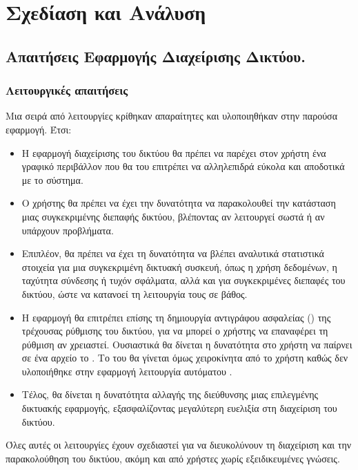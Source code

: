 \chapter{Σχεδίαση και Ανάλυση}

\section{Απαιτήσεις Εφαρμογής Διαχείρισης Δικτύου.}




\subsection{Λειτουργικές απαιτήσεις}

Μια σειρά από λειτουργίες κρίθηκαν απαραίτητες και υλοποιηθήκαν στην παρούσα εφαρμογή. Έτσι:

\begin{itemize}
    \item Η εφαρμογή διαχείρισης του δικτύου θα πρέπει να  παρέχει στον χρήστη ένα γραφικό περιβάλλον που θα του επιτρέπει να αλληλεπιδρά εύκολα και αποδοτικά με το σύστημα. 
    \item Ο χρήστης θα πρέπει να έχει την δυνατότητα να παρακολουθεί την κατάσταση μιας συγκεκριμένης διεπαφής δικτύου, βλέποντας αν λειτουργεί σωστά ή αν υπάρχουν προβλήματα. 
    \item Επιπλέον, θα πρέπει να έχει τη δυνατότητα να βλέπει αναλυτικά στατιστικά στοιχεία για μια συγκεκριμένη δικτυακή συσκευή, όπως η χρήση δεδομένων, η ταχύτητα σύνδεσης ή τυχόν σφάλματα, αλλά και για συγκεκριμένες διεπαφές του δικτύου, ώστε να κατανοεί τη λειτουργία τους σε βάθος.
    \item Η εφαρμογή θα επιτρέπει επίσης τη δημιουργία αντιγράφου ασφαλείας () της τρέχουσας ρύθμισης του δικτύου, για να μπορεί ο χρήστης να επαναφέρει τη ρύθμιση αν χρειαστεί. Ουσιαστικά θα δίνεται η δυνατότητα στο χρήστη να παίρνει σε ένα  αρχείο το . Το  του  θα γίνεται όμως χειροκίνητα από το χρήστη καθώς δεν υλοποιήθηκε στην εφαρμογή λειτουργία αυτόματου .
    \item Τέλος, θα δίνεται η δυνατότητα αλλαγής της διεύθυνσης  μιας επιλεγμένης δικτυακής εφαρμογής, εξασφαλίζοντας μεγαλύτερη ευελιξία στη διαχείριση του δικτύου. 
\end{itemize}

Όλες αυτές οι λειτουργίες έχουν σχεδιαστεί για να διευκολύνουν τη διαχείριση και την παρακολούθηση του δικτύου, ακόμη και από χρήστες χωρίς εξειδικευμένες γνώσεις.


